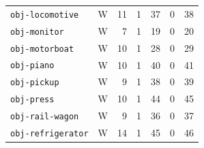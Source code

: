 \begin{table}[!ht]
\begin{tabularx}{\textwidth}{@{}Xcrrrrr@{}}
\texttt{obj-locomotive} & W & 11 & 1 & 37 & 0 & 38\\
\texttt{obj-monitor} & W & 7 & 1 & 19 & 0 & 20\\
\texttt{obj-motorboat} & W & 10 & 1 & 28 & 0 & 29\\
\texttt{obj-piano} & W & 10 & 1 & 40 & 0 & 41\\
\texttt{obj-pickup} & W & 9 & 1 & 38 & 0 & 39\\
\texttt{obj-press} & W & 10 & 1 & 44 & 0 & 45\\
\texttt{obj-rail-wagon} & W & 9 & 1 & 36 & 0 & 37\\
\texttt{obj-refrigerator} & W & 14 & 1 & 45 & 0 & 46\\
\bottomrule
\end{tabularx}
\end{table}
